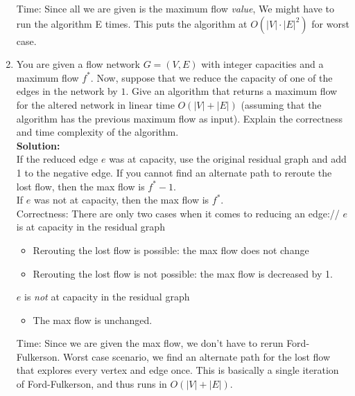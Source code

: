 \documentclass[11pt]{article}
\begin{document}
\begin{enumerate}
Time: Since all we are given is the maximum flow \textit{value}, We might have to run the algorithm E times. This puts the algorithm at $O(|V|\cdot |E|^2)$ for worst case.

\item
You are given a flow network $G=(V,E)$ with integer capacities and a maximum flow $f^*$. Now,
suppose that we reduce the capacity of one of the edges in the network
by $1$. Give an algorithm that returns a maximum flow for the altered
network in linear time $O(|V|+|E|)$ (assuming that the algorithm has
the previous maximum flow as input). Explain the correctness and time
complexity of the algorithm.\\
\textbf{Solution:}\\
If the reduced edge $e$ was at capacity, use the original residual graph and add 1 to the negative edge. If you cannot find an alternate path to reroute the lost flow, then the max flow is $f^* - 1$.\\
If $e$ was not at capacity, then the max flow is $f^*$.\\

Correctness: There are only two cases when it comes to reducing an edge://
$e$ is at capacity in the residual graph
\begin{itemize}
\item
Rerouting the lost flow is possible: the max flow does not change
\item
Rerouting the lost flow is not possible: the max flow is decreased by 1.
\end{itemize}

$e$ is \textit{not} at capacity in the residual graph
\begin{itemize}
\item
The max flow is unchanged.
\end{itemize}

Time: Since we are given the max flow, we don't have to rerun Ford-Fulkerson. Worst case scenario, we find an alternate path for the lost flow that explores every vertex and edge once. This is basically a single iteration of Ford-Fulkerson, and thus runs in $O(|V| + |E|)$.




\end{enumerate}
\end{document}
